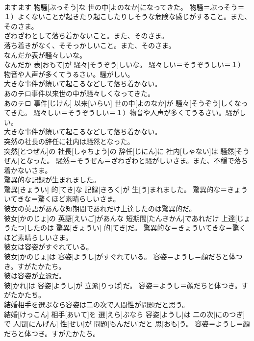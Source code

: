 \documentclass[8pt]{extreport}
\begin{document}
\begin{CJK}{UTF8}{min}
{\\	ますます 物騒[ぶっそう]な 世の中[よのなか]になってきた。	物騒＝ぶっそう＝１）よくないことが起きたり起こしたりしそうな危険な感じがすること。また、そのさま。 　　　　　　　　
\\	ざわざわとして落ち着かないこと。また、そのさま。 　　　　　　　　
\\	落ち着きがなく、そそっかしいこと。また、そのさま。
\\	なんだか表が騒々しいな。	
\\	なんだか 表[おもて]が 騒々[そうぞう]しいな。	騒々しい＝そうぞうしい＝１）物音や人声が多くてうるさい。騒がしい。 　　　　　　　　　　　　
\\	大きな事件が続いて起こるなどして落ち着かない。
\\	あのテロ事件以来世の中が騒々しくなってきた。	
\\	あのテロ 事件[じけん] 以来[いらい] 世の中[よのなか]が 騒々[そうぞう]しくなってきた。	騒々しい＝そうぞうしい＝１）物音や人声が多くてうるさい。騒がしい。 　　　　　　　　　　　　
\\	大きな事件が続いて起こるなどして落ち着かない。
\\	突然の社長の辞任に社内は騒然となった。	
\\	突然[とつぜん]の 社長[しゃちょう]の 辞任[じにん]に 社内[しゃない]は 騒然[そうぜん]となった。	騒然＝そうぜん＝ざわざわと騒がしいさま。また、不穏で落ち着かないさま。
\\	驚異的な記録が生まれました。	
\\	驚異[きょうい] 的[てき]な 記録[きろく]が 生[う]まれました。	驚異的な＝きょういてきな＝驚くほど素晴らしいさま。
\\	彼女の英語があんな短期間であれだけ上達したのは驚異的だ。	
\\	彼女[かのじょ]の 英語[えいご]があんな 短期間[たんきかん]であれだけ 上達[じょうたつ]したのは 驚異[きょうい] 的[てき]だ。	驚異的な＝きょういてきな＝驚くほど素晴らしいさま。
\\	彼女は容姿がすぐれている。	
\\	彼女[かのじょ]は 容姿[ようし]がすぐれている。	容姿＝ようし＝顔だちと体つき。すがたかたち。
\\	彼は容姿が立派だ。	
\\	彼[かれ]は 容姿[ようし]が 立派[りっぱ]だ。	容姿＝ようし＝顔だちと体つき。すがたかたち。
\\	結婚相手を選ぶなら容姿は二の次で人間性が問題だと思う。	
\\	結婚[けっこん] 相手[あいて]を 選[えら]ぶなら 容姿[ようし]は 二の次[にのつぎ]で 人間[にんげん] 性[せい]が 問題[もんだい]だと 思[おも]う。	容姿＝ようし＝顔だちと体つき。すがたかたち。
}
\end{CJK}
\end{document}
